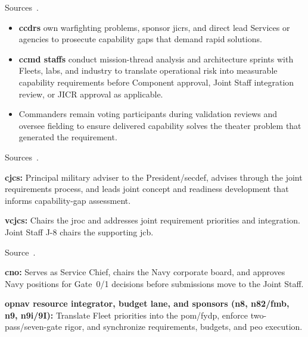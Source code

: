 \documentclass[../main.tex]{subfiles}
\begin{document}
\begin{description}[style=nextline, labelsep=0.5em, font=\bfseries]
  \item[\textbf{Combatant command sponsors.}]
        Sources~\autocite{edo-2-1-1-command-structures-2025,edo-3-3-3-jfrp-2026}.
        \begin{itemize}
          \item \textbf{\ac{ccdr}s} own warfighting problems, sponsor \acp{jicr}, and direct lead Services or agencies to prosecute capability gaps that demand rapid solutions.
          \item \textbf{\ac{ccmd} staffs} conduct mission-thread analysis and architecture sprints with Fleets, labs, and industry to translate operational risk into measurable capability requirements before Component approval, Joint Staff integration review, or JICR approval as applicable.
          \item Commanders remain voting participants during validation reviews and oversee fielding to ensure delivered capability solves the theater problem that generated the requirement.
        \end{itemize}

  \item[\textbf{Joint Chiefs leadership.}]
        Sources~\autocite{edo-2-1-1-command-structures-2025,edo-3-3-3-jfrp-2026,USC-10-181}.
        \begin{description}
          \item \textbf{\ac{cjcs}:} Principal military adviser to the President/\ac{secdef}, advises through the joint requirements process, and leads joint concept and readiness development that informs capability-gap assessment.
          \item \textbf{\ac{vcjcs}:} Chairs the \ac{jroc} and addresses joint requirement priorities and integration. Joint Staff J-8 chairs the supporting \ac{jcb}.
        \end{description}

  \item[\textbf{OPNAV corporate leadership.}]
        Source~\autocite{edo-2-1-1-command-structures-2025}.
        \begin{description}
          \item \textbf{\ac{cno}:} Serves as Service Chief, chairs the Navy corporate board, and approves Navy positions for Gate~0/1 decisions before submissions move to the Joint Staff.
          \item \textbf{\ac{opnav} resource integrator, budget lane, and sponsors (\ac{n8}, \ac{n82}/\ac{fmb}, \ac{n9}, \ac{n9i}/9I):} Translate Fleet priorities into the \ac{pom}/\ac{fydp}, enforce two-pass/seven-gate rigor, and synchronize requirements, budgets, and \ac{peo} execution.
        \end{description}


\end{description}
\end{document}
